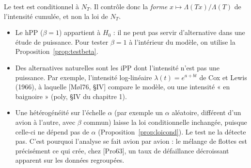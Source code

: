 \begin{remarque}\label{rem:portee}
Le test est conditionnel à $N_T$. Il contrôle donc la \emph{forme} $x\mapsto\Lambda(Tx)/\Lambda(T)$ de l'intensité cumulée, et non la loi de $N_T$.
\begin{itemize}
\item Le hPP ($\beta=1$) appartient à $H_0$ : il ne peut pas servir d'alternative dans une étude de puissance. Pour tester $\beta=1$ à l'intérieur du modèle, on utilise la Proposition~\ref{prop:testbeta}.
\item Des alternatives naturelles sont les iPP dont l'intensité n'est pas une puissance. Par exemple, l'intensité log-linéaire $\lambda(t)=e^{a+bt}$ de Cox et Lewis (1966), à laquelle [Møl76, §IV] compare le modèle, ou une intensité « en baignoire » (poly, §IV du chapitre 1).
\item Une hétérogénéité sur l'échelle $\alpha$ (par exemple un $\alpha$ aléatoire, différent d'un avion à l'autre, avec $\beta$ commun) laisse la loi conditionnelle inchangée, puisque celle-ci ne dépend pas de $\alpha$ (Proposition~\ref{prop:loicond}). Le test ne la détecte pas. C'est pourquoi l'analyse se fait avion par avion : le mélange de flottes est précisément ce qui crée, chez [Pro63], un taux de défaillance décroissant apparent sur les données regroupées.
\end{itemize}
\end{remarque}
